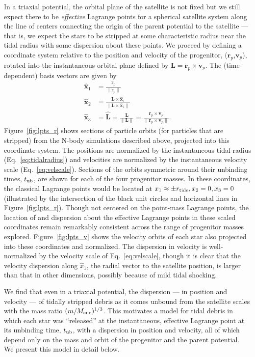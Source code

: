 \documentclass[letterpaper,12pt,preprint]{aastex}
\newcommand{\rtide}{r_{\rm tide}}
\newcommand{\bs}{\boldsymbol}
\newcommand{\tub}{t_{\rm ub}}
\begin{document}
In a triaxial potential, the orbital plane of the satellite is not fixed but we still expect there to be \emph{effective} Lagrange points for a spherical satellite system along the line of centers connecting the origin of the parent potential to the satellite --- that is, we expect the stars to be stripped at some characteristic radius near the tidal radius with some dispersion about these points. We proceed by defining a coordinate system relative to the position and velocity of the progenitor, ($\bs{r}_p$,$\bs{v}_p$), rotated into the instantaneous orbital plane defined by $\bs{L} = \bs{r}_p \times \bs{v}_p$. The (time-dependent) basis vectors are given by
\begin{align}
	\hat{\bs{x}}_1 &= \frac{\bs{r}_p}{\|\bs{r}_p\|}\label{eq:x1}\\
	\hat{\bs{x}}_2 &= \frac{\bs{L} \times \hat{\bs{x}}_1}{\|\bs{L} \times \hat{\bs{x}}_1\|}\\
	\hat{\bs{x}}_3 &= \hat{\bs{L}} = \frac{\bs{L}}{\|\bs{L}\|} = \frac{\bs{r}_p \times \bs{v}_p}{\|\bs{r}_p \times \bs{v}_p\|}\label{eq:x3}.
\end{align}
Figure~\ref{fig:lpts_r} shows sections of particle orbits (for particles that are stripped) from the N-body simulations described above, projected into this coordinate system. The positions are normalized by the instantaneous tidal radius (Eq.~\ref{eq:tidalradius}) and velocities are normalized by the instantaneous velocity scale (Eq.~\ref{eq:velscale}). Sections of the orbits symmetric around their unbinding times, $\tub$, are shown for each of the four progenitor masses. In these coordinates, the classical Lagrange points would be located at $x_1\approx\pm\rtide,x_2=0,x_3=0$ (illustrated by the intersection of the black unit circles and horizontal lines in Figure~\ref{fig:lpts_r}). Though not centered on the point-mass Lagrange points, the location of and dispersion about the effective Lagrange points in these scaled coordinates remain remarkably consistent across the range of progenitor masses explored. Figure~\ref{fig:lpts_v} shows the velocity orbits of each star also projected into these coordinates and normalized. The dispersion in velocity is well-normalized by the velocity scale of Eq.~\ref{eq:velscale}, though it is clear that the velocity dispersion along $\hat{x}_1$, the radial vector to the satellite position, is larger than that in other dimensions, possibly because of mild tidal shocking. 

We find that even in a triaxial potential, the dispersion --- in position and velocity --- of tidally stripped debris as it comes unbound from the satellite scales with the mass ratio $(m / M_{\rm enc})^{1/3}$. This motivates a model for tidal debris in which each star was ``released'' at the instantaneous, effective Lagrange point at its unbinding time, $\tub$, with a dispersion in position and velocity, all of which depend only on the mass and orbit of the progenitor and the parent potential. We present this model in detail below.
\end{document}
